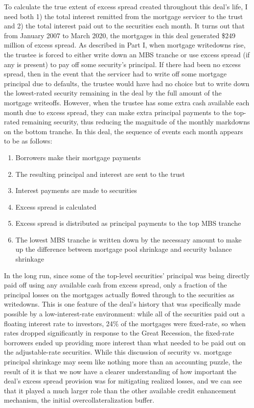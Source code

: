 \documentclass[12pt]{article}
\begin{document}
To calculate the true extent of excess spread created throughout this deal’s life, I need both 1) the total interest remitted from the mortgage servicer to the trust and 2) the total interest paid out to the securities each month. It turns out that from January 2007 to March 2020, the mortgages in this deal generated \$249 million of excess spread. As described in Part I, when mortgage writedowns rise, the trustee is forced to either write down an MBS tranche or use excess spread (if any is present) to pay off some security's principal. If there had been no excess spread, then in the event that the servicer had to write off some mortgage principal due to defaults, the trustee would have had no choice but to write down the lowest-rated security remaining in the deal by the full amount of the mortgage writeoffs. However, when the trustee has some extra cash available each month due to excess spread, they can make extra principal payments to the top-rated remaining security, thus reducing the magnitude of the monthly markdowns on the bottom tranche. In this deal, the sequence of events each month appears to be as follows:

\begin{enumerate}
	\item Borrowers make their mortgage payments
	\item The resulting principal and interest are sent to the trust
	\item Interest payments are made to securities
	\item Excess spread is calculated
	\item Excess spread is distributed as principal payments to the top MBS tranche
	\item The lowest MBS tranche is written down by the necessary amount to make up the difference between mortgage pool shrinkage and security balance shrinkage
\end{enumerate}

In the long run, since some of the top-level securities’ principal was being directly paid off using any available cash from excess spread, only a fraction of the principal losses on the mortgages actually flowed through to the securities as writedowns. This is one feature of the deal’s history that was specifically made possible by a low-interest-rate environment: while all of the securities paid out a floating interest rate to investors, 24\% of the mortgages were fixed-rate, so when rates dropped significantly in response to the Great Recession, the fixed-rate borrowers ended up providing more interest than what needed to be paid out on the adjustable-rate securities. While this discussion of security vs. mortgage principal shrinkage may seem like nothing more than an accounting puzzle, the result of it is that we now have a clearer understanding of how important the deal’s excess spread provision was for mitigating realized losses, and we can see that it played a much larger role than the other available credit enhancement mechanism, the initial overcollateralization buffer.
\end{document}

